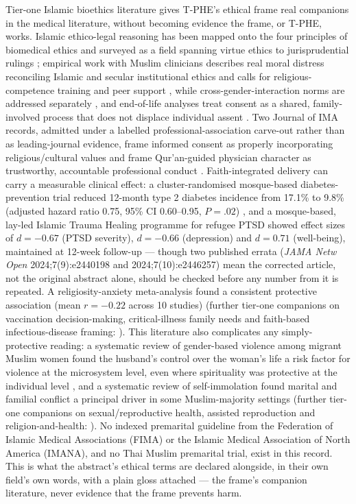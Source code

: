 \documentclass[11pt]{article}
\newcommand{\tphe}{T\mbox{-}PHE}
\begin{document}
Tier-one Islamic bioethics literature gives \tphe{}'s ethical frame real companions in the medical literature, without becoming evidence the frame, or \tphe{}, works. Islamic ethico-legal reasoning has been mapped onto the four principles of biomedical ethics \cite{ref225} and surveyed as a field spanning virtue ethics to jurisprudential rulings \cite{ref228,ref230}; empirical work with Muslim clinicians describes real moral distress reconciling Islamic and secular institutional ethics and calls for religious-competence training and peer support \cite{ref227}, while cross-gender-interaction norms are addressed separately \cite{ref226}, and end-of-life analyses treat consent as a shared, family-involved process that does not displace individual assent \cite{ref229}. Two Journal of IMA records, admitted under a labelled professional-association carve-out rather than as leading-journal evidence, frame informed consent as properly incorporating religious/cultural values \cite{ref241} and frame Qur'an-guided physician character as trustworthy, accountable professional conduct \cite{ref242}. Faith-integrated delivery can carry a measurable clinical effect: a cluster-randomised mosque-based diabetes-prevention trial reduced 12-month type 2 diabetes incidence from 17.1\% to 9.8\% (adjusted hazard ratio 0.75, 95\% CI 0.60--0.95, $P=.02$) \cite{ref231}, and a mosque-based, lay-led Islamic Trauma Healing programme for refugee PTSD showed effect sizes of $d=-0.67$ (PTSD severity), $d=-0.66$ (depression) and $d=0.71$ (well-being), maintained at 12-week follow-up \cite{ref232} --- though two published errata (\emph{JAMA Netw Open} 2024;7(9):e2440198 and 2024;7(10):e2446257) mean the corrected article, not the original abstract alone, should be checked before any number from it is repeated. A religiosity-anxiety meta-analysis found a consistent protective association (mean $r=-0.22$ across 10 studies) \cite{ref238} (further tier-one companions on vaccination decision-making, critical-illness family needs and faith-based infectious-disease framing: \cite{ref233,ref234,ref243}). This literature also complicates any simply-protective reading: a systematic review of gender-based violence among migrant Muslim women found the husband's control over the woman's life a risk factor for violence at the microsystem level, even where spirituality was protective at the individual level \cite{ref235}, and a systematic review of self-immolation found marital and familial conflict a principal driver in some Muslim-majority settings \cite{ref239} (further tier-one companions on sexual/reproductive health, assisted reproduction and religion-and-health: \cite{ref236,ref237,ref240}). No indexed premarital guideline from the Federation of Islamic Medical Associations (FIMA) or the Islamic Medical Association of North America (IMANA), and no Thai Muslim premarital trial, exist in this record. This is what the abstract's ethical terms are declared alongside, in their own field's own words, with a plain gloss attached --- the frame's companion literature, never evidence that the frame prevents harm.
\end{document}
